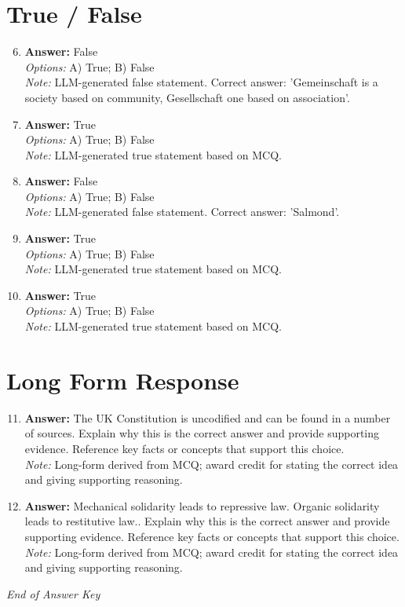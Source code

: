 \documentclass[12pt]{article}
\begin{document}
\section*{True / False}
\begin{enumerate}[label=\arabic*.]
\setcounter{enumi}{5}
\item \textbf{Answer:} False
\\ \textit{Options:} A) True; B) False
\\ \textit{Note:} LLM-generated false statement. Correct answer: 'Gemeinschaft is a society based on community, Gesellschaft one based on association'.
\item \textbf{Answer:} True
\\ \textit{Options:} A) True; B) False
\\ \textit{Note:} LLM-generated true statement based on MCQ.
\item \textbf{Answer:} False
\\ \textit{Options:} A) True; B) False
\\ \textit{Note:} LLM-generated false statement. Correct answer: 'Salmond'.
\item \textbf{Answer:} True
\\ \textit{Options:} A) True; B) False
\\ \textit{Note:} LLM-generated true statement based on MCQ.
\item \textbf{Answer:} True
\\ \textit{Options:} A) True; B) False
\\ \textit{Note:} LLM-generated true statement based on MCQ.
\end{enumerate}

\section*{Long Form Response}
\begin{enumerate}[label=\arabic*.]
\setcounter{enumi}{10}
\item \textbf{Answer:} The UK Constitution is uncodified and can be found in a number of sources. Explain why this is the correct answer and provide supporting evidence. Reference key facts or concepts that support this choice.
\\ \textit{Note:} Long-form derived from MCQ; award credit for stating the correct idea and giving supporting reasoning.
\item \textbf{Answer:} Mechanical solidarity leads to repressive law. Organic solidarity leads to restitutive law.. Explain why this is the correct answer and provide supporting evidence. Reference key facts or concepts that support this choice.
\\ \textit{Note:} Long-form derived from MCQ; award credit for stating the correct idea and giving supporting reasoning.
\end{enumerate}

\vfill
\noindent\textit{End of Answer Key}
\end{document}
